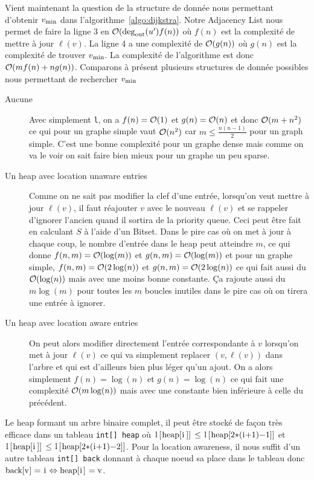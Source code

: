 Vient maintenant la question de la structure de donnée nous permettant d'obtenir $v_\mathrm{min}$ dans l'algorithme~\ref{algo:dijkstra}.
Notre Adjacency List nous permet de faire la ligne 3 en $\mathcal{O}(\deg_\mathrm{out}(u') f(n))$ où $f(n)$ est la complexité de mettre à jour $\ell(v)$.
La ligne 4 a une complexité de $\mathcal{O}(g(n))$ où $g(n)$ est la complexité de trouver $v_\mathrm{min}$.
La complexité de l'algorithme est donc $\mathcal{O}(mf(n) + ng(n))$.
Comparons à présent plusieurs structures de donnée possibles nous permettant de rechercher $v_\mathrm{min}$
\begin{description}
  \item[Aucune] Avec simplement \lstinline|l|, on a $f(n) = \mathcal{O}(1)$ et $g(n) = \mathcal{O}(n)$ et donc $\mathcal{O}(m + n^2)$ ce qui pour un graphe simple vaut $\mathcal{O}(n^2)$ car $m \leq \frac{n(n-1)}{2}$ pour un graph simple. C'est une bonne complexité pour un graphe dense mais comme on va le voir on sait faire bien mieux pour un graphe un peu sparse.
  \item[Un heap avec location unaware entries] Comme on ne sait pas modifier la clef d'une entrée, lorsqu'on veut mettre à jour $\ell(v)$, il faut réajouter $v$ avec le nouveau $\ell(v)$ et se rappeler d'ignorer
    l'ancien quand il sortira de la priority queue. Ceci peut être fait en calculant $S$ à l'aide d'un Bitset.
    Dans le pire cas où on met à jour à chaque coup, le nombre d'entrée dans le heap peut atteindre $m$, ce qui donne
    $f(n, m) = \mathcal{O}(\log(m))$ et $g(n, m) = \mathcal{O}(\log(m))$ et pour un graphe simple,
    $f(n, m) = \mathcal{O}(2\log(n))$ et $g(n, m) = \mathcal{O}(2\log(n))$ ce qui fait aussi du $\mathcal{O}(\log(n))$ mais avec une moins bonne constante.
    Ça rajoute aussi du $m \log(m)$ pour toutes les $m$ boucles inutiles dans le pire cas où on tirera une entrée à ignorer.
  \item[Un heap avec location aware entries] On peut alors modifier directement l'entrée correspondante à $v$ lorsqu'on met
    à jour $\ell(v)$ ce qui va simplement replacer $(v, \ell(v))$ dans l'arbre et qui est d'ailleurs bien plus léger qu'un ajout.
    On a alors simplement $f(n) = \log(n)$ et $g(n) = \log(n)$ ce qui fait une complexité $\mathcal{O}(m\log(n))$ mais avec une constante bien
    inférieure à celle du précédent.
\end{description}
Le heap formant un arbre binaire complet, il peut être stocké de façon très efficace dans un tableau \lstinline|int[] heap|
où $\lstinline|l[heap[i]]| \leq \lstinline|l[heap[2*(i+1)-1]]|$ et $\lstinline|l[heap[i]]| \leq \lstinline|l[heap[2*(i+1)-2]]|$.
Pour la location awareness, il nous suffit d'un autre tableau \lstinline|int[] back|
donnant à chaque noeud sa place dans le tableau donc $\lstinline|back[v]| = \lstinline|i| \Leftrightarrow \lstinline|heap[i]| = \lstinline|v|$.

